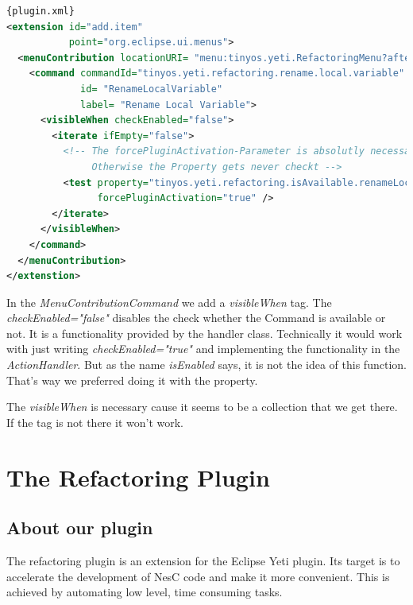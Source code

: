 \documentclass[a4paper,10pt]{report}
\begin{document}
\begin{lstlisting}[language=XML,caption=Visibility condition ({\it plugin.xml})]{plugin.xml}
<extension id="add.item"
           point="org.eclipse.ui.menus">
  <menuContribution locationURI= "menu:tinyos.yeti.RefactoringMenu?after=additions">
    <command commandId="tinyos.yeti.refactoring.rename.local.variable"
             id= "RenameLocalVariable"
             label= "Rename Local Variable">
      <visibleWhen checkEnabled="false">
        <iterate ifEmpty="false">
          <!-- The forcePluginActivation-Parameter is absolutly necessary. 
               Otherwise the Property gets never checkt -->
          <test property="tinyos.yeti.refactoring.isAvailable.renameLocalVariable"
                forcePluginActivation="true" />
        </iterate>
      </visibleWhen>
    </command>
  </menuContribution>
</extenstion>
\end{lstlisting}
In the {\it MenuContributionCommand} we add a {\it visibleWhen} tag. The {\it checkEnabled="false"} disables the check whether the Command is available or not. 
It is a functionality provided by the handler class. Technically it would work with just writing {\it checkEnabled="true"} and implementing the functionality in 
the {\it ActionHandler}. But as the name {\it isEnabled} says, it is not the idea of this function. That's way we preferred doing it with the property.

The {\it visibleWhen} is necessary cause it seems to be a collection that we get there. If the tag is not there it won't work.

\part{The Refactoring Plugin}
\chapter{About our plugin}
The refactoring plugin is an extension for the Eclipse Yeti plugin. Its target is to accelerate the development of NesC code and make it more convenient.
This is achieved by automating low level, time consuming tasks.
\end{document}
